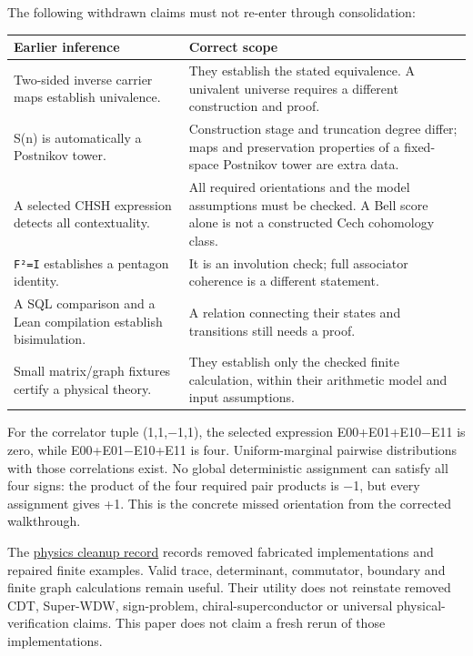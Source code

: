 \documentclass[
  11pt,
]{article}
\begin{document}
The following withdrawn claims must not re-enter through consolidation:

\begin{longtable}[]{@{}
  >{\raggedright\arraybackslash}p{}
  >{\raggedright\arraybackslash}p{}@{}}
\toprule\noalign{}
\begin{minipage}[b]{\linewidth}\raggedright
Earlier inference
\end{minipage} & \begin{minipage}[b]{\linewidth}\raggedright
Correct scope
\end{minipage} \\
\midrule\noalign{}
\endhead
\bottomrule\noalign{}
\endlastfoot
Two-sided inverse carrier maps establish univalence. & They establish
the stated equivalence. A univalent universe requires a different
construction and proof. \\
S(n) is automatically a Postnikov tower. & Construction stage and
truncation degree differ; maps and preservation properties of a
fixed-space Postnikov tower are extra data. \\
A selected CHSH expression detects all contextuality. & All required
orientations and the model assumptions must be checked. A Bell score
alone is not a constructed Cech cohomology class. \\
\texttt{F²=I} establishes a pentagon identity. & It is an involution
check; full associator coherence is a different statement. \\
A SQL comparison and a Lean compilation establish bisimulation. & A
relation connecting their states and transitions still needs a proof. \\
Small matrix/graph fixtures certify a physical theory. & They establish
only the checked finite calculation, within their arithmetic model and
input assumptions. \\
\end{longtable}

For the correlator tuple (1,1,−1,1), the selected expression
E00+E01+E10−E11 is zero, while E00+E01−E10+E11 is four. Uniform-marginal
pairwise distributions with those correlations exist. No global
deterministic assignment can satisfy all four signs: the product of the
four required pair products is −1, but every assignment gives +1. This
is the concrete missed orientation from the corrected walkthrough.

The
\href{../../../../../omega_engine_education/documentation/003_minimal_symbol_system_n_mssn/physics_claim_cleanup.md}{physics
cleanup record} records removed fabricated implementations and repaired
finite examples. Valid trace, determinant, commutator, boundary and
finite graph calculations remain useful. Their utility does not
reinstate removed CDT, Super-WDW, sign-problem, chiral-superconductor or
universal physical-verification claims. This paper does not claim a
fresh rerun of those implementations.
\end{document}
